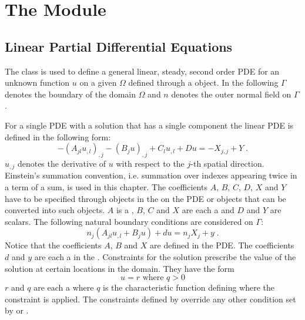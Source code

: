 
%
%
%

\chapter{The \linearPDEs Module}

\section{Linear Partial Differential Equations}
\label{SEC LinearPDE}

The \LinearPDE class is used to define a general linear, steady, second order
PDE for an unknown function $u$ on a given $\Omega$ defined through a \Domain object.
In the following $\Gamma$ denotes the boundary of the domain $\Omega$ and $n$
denotes the outer normal field on $\Gamma$.

For a single PDE with a solution that has a single component the linear PDE is
defined in the following form:
\begin{equation}\label{LINEARPDE.SINGLE.1}
-(A_{jl} u_{,l})_{,j}-(B_{j} u)_{,j}+C_{l} u_{,l}+D u =-X_{j,j}+Y \; .
\end{equation}
$u_{,j}$ denotes the derivative of $u$ with respect to the $j$-th spatial direction.
Einstein's summation convention, i.e. summation over indexes appearing twice
in a term of a sum, is used in this chapter.
The coefficients $A$, $B$, $C$, $D$, $X$ and $Y$ have to be specified through
\Data objects in the \Function on the PDE or objects that can be converted
into such \Data objects.
$A$ is a \RankTwo, $B$, $C$ and $X$ are each a \RankOne and $D$ and $Y$ are
scalars.
The following natural boundary conditions are considered on $\Gamma$:
\begin{equation}\label{LINEARPDE.SINGLE.2}
n_{j}(A_{jl} u_{,l}+B_{j} u)+d u=n_{j}X_{j} + y  \;.
\end{equation}
Notice that the coefficients $A$, $B$ and $X$ are defined in the PDE.
The coefficients $d$ and $y$ are each a \Scalar in the \FunctionOnBoundary.
Constraints for the solution prescribe the value of the
solution at certain locations in the domain. They have the form
\begin{equation}\label{LINEARPDE.SINGLE.3}
u=r \mbox{ where } q>0
\end{equation}
$r$ and $q$ are each a \Scalar where $q$ is the characteristic function
defining where the constraint is applied.
The constraints defined by  override any other
condition set by  or .

